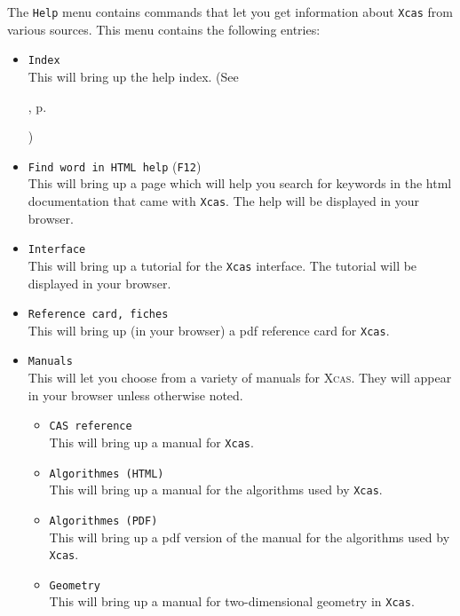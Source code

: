 \documentclass[a4paper,11pt]{book}
\begin{document}
The \texttt{Help} menu contains commands that let you get information
about \texttt{Xcas} from various sources.
This menu contains the following entries: 
\begin{itemize}
  \item \texttt{Index}\\
  This will bring up the help index.
  (See 
  \begin{latexonly}, p.\pageref{sssec:helpind}\end{latexonly})

  \item \texttt{Find word in HTML help} (\texttt{F12})\\
  This will bring up a page which will help you search for keywords in
  the html documentation that came with \texttt{Xcas}.  The help will
  be displayed in your browser.
  
  \item \texttt{Interface}\\
  This will bring up a tutorial for the \texttt{Xcas} interface.  The
  tutorial will be displayed in your browser.
  
  \item \texttt{Reference card, fiches}\\
  This will bring up (in your browser) a pdf reference card for
  \texttt{Xcas}.
  
  \item \texttt{Manuals}\\
  This will let you choose from a variety of manuals for \textsc{Xcas}.
  They will appear in your browser unless otherwise noted.
  \begin{itemize}
  \item \texttt{CAS reference}\\
  This will bring up a manual for \texttt{Xcas}.
  
  \item \texttt{Algorithmes (HTML)}\\
  This will bring up a manual for the algorithms used by \texttt{Xcas}.
  
  \item \texttt{Algorithmes (PDF)}\\
  This will bring up a pdf version of the manual for the algorithms
  used by \texttt{Xcas}. 

  \item \texttt{Geometry}\\
  This will bring up a manual for two-dimensional geometry in
  \texttt{Xcas}.


\end{itemize}
\end{itemize}
\end{document}
